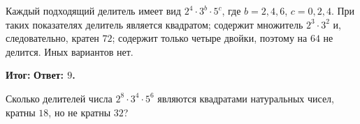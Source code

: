 \documentclass[a4paper,11pt]{article}
\newcommand{\subhead}[1]{\par\vspace{3pt}{\bfseries\textcolor{ink}{#1}}\par\vspace{1pt}}
\newcommand{\finallabel}{\textcolor{accent}{\textbf{Итог:}}}
\begin{document}
\subhead{Проверка}
Каждый подходящий делитель имеет вид $2^4\cdot3^b\cdot5^c$, где $b=2,4,6$, $c=0,2,4$. При таких показателях делитель является квадратом; содержит множитель $2^3\cdot3^2$ и, следовательно, кратен $72$; содержит только четыре двойки, поэтому на $64$ не делится. Иных вариантов нет.

\finallabel{} \textbf{Ответ: $9$.}

\subhead{Задача на закрепление}
Сколько делителей числа $2^8\cdot3^4\cdot5^6$ являются квадратами натуральных чисел, кратны $18$, но не кратны $32$?
\end{document}
